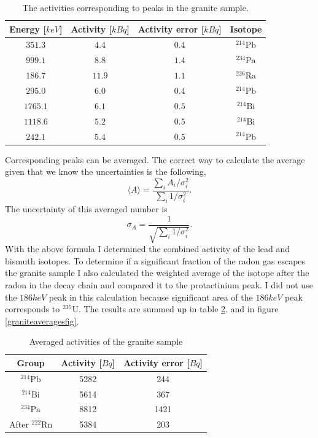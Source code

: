 \documentclass[pdftex,12pt,a4paper]{article}
\begin{document}
		\begin{table}[H]
		\centering
		\begin{tabular}{|c|c|c|c|}
			\hline
			Energy [$keV$] & Activity [$kBq$]& Activity error [$kBq$]& Isotope \\
			\hline
            $351.3$ & $4.4$ & $0.4$ & $^{214}\text{Pb}$ \\
            $999.1$ & $8.8$ & $1.4$ & $^{234}\text{Pa}$ \\
            $186.7$ & $11.9$ & $1.1$ & $^{226}\text{Ra}$ \\
            $295.0$ & $6.0$ & $0.4$ & $^{214}\text{Pb}$ \\
            $1765.1$ & $6.1$ & $0.5$ & $^{214}\text{Bi}$ \\
            $1118.6$ & $5.2$ & $0.5$ & $^{214}\text{Bi}$ \\
            $242.1$ & $5.4$ & $0.5$ & $^{214}\text{Pb}$ \\
			\hline
		\end{tabular}
		\caption{The activities corresponding to peaks in the granite sample.}
		 \label{granitepeaks}
		\end{table}
		Corresponding peaks can be averaged. The correct way to calculate the average given that we know the uncertainties is the following,
		\begin{equation}
			\langle A\rangle = \frac{\sum_i A_i / \sigma_i^2}{\sum_i 1 / \sigma_i^2}.
		\end{equation}
		The uncertainty of this averaged number is
		\begin{equation}
			\sigma_A = \frac{1}{\sqrt{\sum_i 1 / \sigma_i^2}}.
		\end{equation}
		With the above formula I determined the combined activity of the lead and bismuth isotopes. To determine if a significant fraction of the radon gas escapes the granite sample I also calculated the weighted average of the isotope after the radon in the decay chain and compared it to the protactinium peak. I did not use the $186keV$ peak in this calculation because significant area of the $186keV$ peak corresponds to $^{235}\text{U}$. The results are summed up in table \ref{graniteaverages}. and in figure \ref{graniteaveragesfig}.
		\begin{table}[H]
		\centering
		\begin{tabular}{|c|c|c|}
			\hline
			Group & Activity [$Bq$] & Activity error [$Bq$] \\
			\hline
            $^{214}\text{Pb}$ & 5282 & 244 \\
            $^{214}\text{Bi}$ & 5614 & 367 \\
            $^{234}\text{Pa}$ & 8812 & 1421 \\
            After $^{222}\text{Rn}$ & 5384 & 203 \\
            \hline
		\end{tabular}
		\caption{Averaged activities of the granite sample}
		\label{graniteaverages}
		\end{table}
\end{document}
